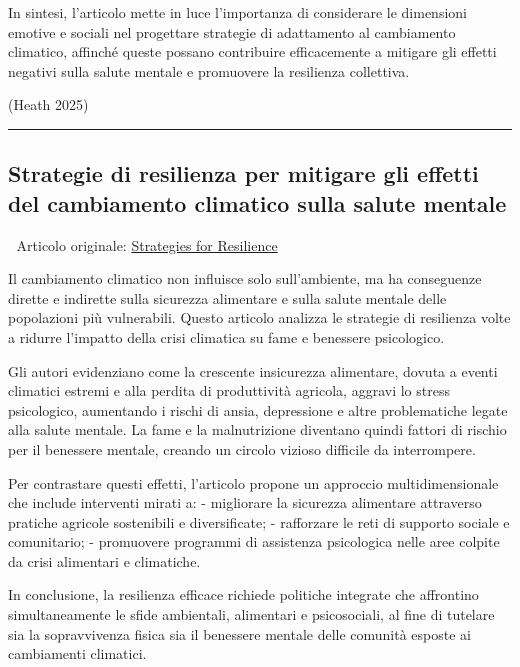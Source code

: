 \documentclass[
]{article}
\begin{document}
In sintesi, l'articolo mette in luce l'importanza di considerare le
dimensioni emotive e sociali nel progettare strategie di adattamento al
cambiamento climatico, affinché queste possano contribuire efficacemente
a mitigare gli effetti negativi sulla salute mentale e promuovere la
resilienza collettiva.

(Heath 2025)

\begin{center}\rule{0.5\linewidth}{0.5pt}\end{center}

\subsection{Strategie di resilienza per mitigare gli effetti del
cambiamento climatico sulla salute
mentale}\label{strategie-di-resilienza-per-mitigare-gli-effetti-del-cambiamento-climatico-sulla-salute-mentale}

📄 Articolo originale:
\href{https://www.sciencedirect.com/science/article/pii/S2666154325003941}{Strategies
for Resilience}

Il cambiamento climatico non influisce solo sull'ambiente, ma ha
conseguenze dirette e indirette sulla sicurezza alimentare e sulla
salute mentale delle popolazioni più vulnerabili. Questo articolo
analizza le strategie di resilienza volte a ridurre l'impatto della
crisi climatica su fame e benessere psicologico.

Gli autori evidenziano come la crescente insicurezza alimentare, dovuta
a eventi climatici estremi e alla perdita di produttività agricola,
aggravi lo stress psicologico, aumentando i rischi di ansia, depressione
e altre problematiche legate alla salute mentale. La fame e la
malnutrizione diventano quindi fattori di rischio per il benessere
mentale, creando un circolo vizioso difficile da interrompere.

Per contrastare questi effetti, l'articolo propone un approccio
multidimensionale che include interventi mirati a: - migliorare la
sicurezza alimentare attraverso pratiche agricole sostenibili e
diversificate; - rafforzare le reti di supporto sociale e comunitario; -
promuovere programmi di assistenza psicologica nelle aree colpite da
crisi alimentari e climatiche.

In conclusione, la resilienza efficace richiede politiche integrate che
affrontino simultaneamente le sfide ambientali, alimentari e
psicosociali, al fine di tutelare sia la sopravvivenza fisica sia il
benessere mentale delle comunità esposte ai cambiamenti climatici.
\end{document}
